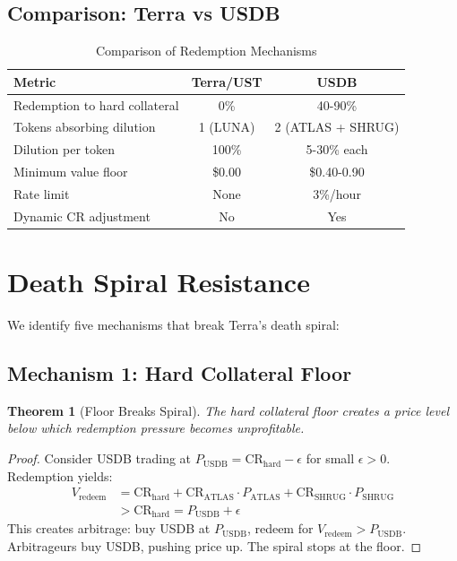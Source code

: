 \documentclass[11pt,a4paper]{article}
\newtheorem{theorem}{Theorem}[section]
\begin{document}
\subsection{Comparison: Terra vs USDB}

\begin{table}[H]
\centering
\caption{Comparison of Redemption Mechanisms}
\begin{tabular}{@{}lcc@{}}
\toprule
\textbf{Metric} & \textbf{Terra/UST} & \textbf{USDB} \\ \midrule
Redemption to hard collateral & 0\% & 40-90\% \\
Tokens absorbing dilution & 1 (LUNA) & 2 (ATLAS + SHRUG) \\
Dilution per token & 100\% & 5-30\% each \\
Minimum value floor & \$0.00 & \$0.40-0.90 \\
Rate limit & None & 3\%/hour \\
Dynamic CR adjustment & No & Yes \\ \bottomrule
\end{tabular}
\end{table}

\section{Death Spiral Resistance}
\label{sec:deathspiral}

We identify five mechanisms that break Terra's death spiral:

\subsection{Mechanism 1: Hard Collateral Floor}

\begin{theorem}[Floor Breaks Spiral]
The hard collateral floor creates a price level below which redemption pressure becomes unprofitable.
\end{theorem}

\begin{proof}
Consider USDB trading at $P_{\text{USDB}} = \text{CR}_{\text{hard}} - \epsilon$ for small $\epsilon > 0$. Redemption yields:
\begin{align}
V_{\text{redeem}} &= \text{CR}_{\text{hard}} + \text{CR}_{\text{ATLAS}} \cdot P_{\text{ATLAS}} + \text{CR}_{\text{SHRUG}} \cdot P_{\text{SHRUG}} \\
&> \text{CR}_{\text{hard}} = P_{\text{USDB}} + \epsilon
\end{align}
This creates arbitrage: buy USDB at $P_{\text{USDB}}$, redeem for $V_{\text{redeem}} > P_{\text{USDB}}$. Arbitrageurs buy USDB, pushing price up. The spiral stops at the floor.
\end{proof}
\end{document}
